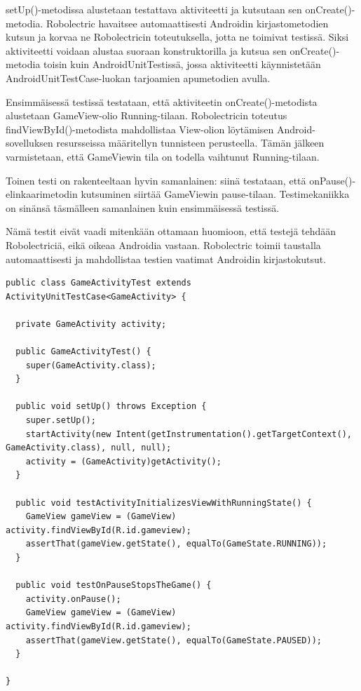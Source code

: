 setUp()-metodissa alustetaan testattava aktiviteetti ja kutsutaan sen onCreate()-metodia. Robolectric havaitsee automaattisesti Androidin kirjastometodien kutsun ja korvaa ne Robolectricin toteutuksella, jotta ne toimivat testissä. Siksi aktiviteetti voidaan alustaa suoraan konstruktorilla ja kutsua sen onCreate()-metodia toisin kuin AndroidUnitTestissä, jossa aktiviteetti käynnistetään AndroidUnitTestCase-luokan tarjoamien apumetodien avulla.

Ensimmäisessä testissä testataan, että aktiviteetin onCreate()-metodista alustetaan GameView-olio Running-tilaan. Robolectricin toteutus findViewById()-metodista mahdollistaa View-olion löytämisen Android-sovelluksen resursseissa määritellyn tunnisteen perusteella. Tämän jälkeen varmistetaan, että GameViewin tila on todella vaihtunut Running-tilaan. 

Toinen testi on rakenteeltaan hyvin samanlainen: siinä testataan, että onPause()-elinkaarimetodin kutsuminen siirtää GameViewin pause-tilaan. Testimekaniikka on sinänsä täsmälleen samanlainen kuin ensimmäisessä testissä.

Nämä testit eivät vaadi mitenkään ottamaan huomioon, että testejä tehdään Robolectriciä, eikä oikeaa Androidia vastaan. Robolectric toimii taustalla automaattisesti ja mahdollistaa testien vaatimat Androidin kirjastokutsut.

\begin{lstlisting}[float,label=androidunit_activitytest,caption=Yksinkertainen aktiviteettiyksikkötesti ActivityUnitTestCasen avulla]
public class GameActivityTest extends ActivityUnitTestCase<GameActivity> {

  private GameActivity activity;

  public GameActivityTest() {
  	super(GameActivity.class);
  }

  public void setUp() throws Exception {
  	super.setUp();
  	startActivity(new Intent(getInstrumentation().getTargetContext(), GameActivity.class), null, null);
    activity = (GameActivity)getActivity();
  }

  public void testActivityInitializesViewWithRunningState() {
    GameView gameView = (GameView) activity.findViewById(R.id.gameview);
    assertThat(gameView.getState(), equalTo(GameState.RUNNING));
  }
  
  public void testOnPauseStopsTheGame() {
  	activity.onPause();
  	GameView gameView = (GameView) activity.findViewById(R.id.gameview);
  	assertThat(gameView.getState(), equalTo(GameState.PAUSED));
  }
  
}
\end{lstlisting}

